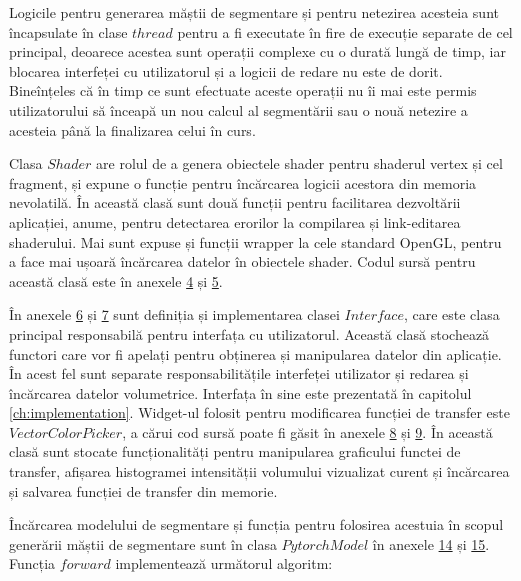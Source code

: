 Logicile pentru generarea măștii de segmentare și pentru netezirea acesteia sunt încapsulate în clase $thread$ pentru a fi executate în fire de execuție separate de cel principal, deoarece acestea sunt operații complexe cu o durată lungă de timp, iar blocarea interfeței cu utilizatorul și a logicii de redare nu este de dorit. Bineînțeles că în timp ce sunt efectuate aceste operații nu îi mai este permis utilizatorului să înceapă un nou calcul al segmentării sau o nouă netezire a acesteia până la finalizarea celui în curs.

Clasa $Shader$ are rolul de a genera obiectele shader pentru shaderul vertex și cel fragment, și expune o funcție pentru încărcarea logicii acestora din memoria nevolatilă. În această clasă sunt două funcții pentru facilitarea dezvoltării aplicației, anume, pentru detectarea erorilor la compilarea și link-editarea shaderului. Mai sunt expuse și funcții wrapper la cele standard OpenGL, pentru a face mai ușoară încărcarea datelor în obiectele shader. Codul sursă pentru această clasă este în anexele \hyperref[appendix:4_shader_h]{4} și \hyperref[appendix:5_shader_cpp]{5}.

În anexele \hyperref[appendix:6_interface_h]{6} și \hyperref[appendix:7_interface_cpp]{7} sunt definiția și implementarea clasei $Interface$, care este clasa principal responsabilă pentru interfața cu utilizatorul. Această clasă stochează functori care vor fi apelați pentru obținerea și manipularea datelor din aplicație. În acest fel sunt separate responsabilitățile interfeței utilizator și redarea și încărcarea datelor volumetrice. Interfața în sine este prezentată în capitolul \ref{ch:implementation}. Widget-ul folosit pentru modificarea funcției de transfer este $VectorColorPicker$, a cărui cod sursă poate fi găsit în anexele \hyperref[appendix:8_tfwidget_h]{8} și \hyperref[appendix:9_tfwidget_cpp]{9}. În această clasă sunt stocate funcționalități pentru manipularea graficului functei de transfer, afișarea histogramei intensității volumului vizualizat curent și încărcarea și salvarea funcției de transfer din memorie.

Încărcarea modelului de segmentare și funcția pentru folosirea acestuia în scopul generării măștii de segmentare sunt în clasa $PytorchModel$ în anexele \hyperref[appendix:14_ptmodel_h]{14} și \hyperref[appendix:15_ptmodel_cpp]{15}. Funcția $forward$ implementează următorul algoritm:

